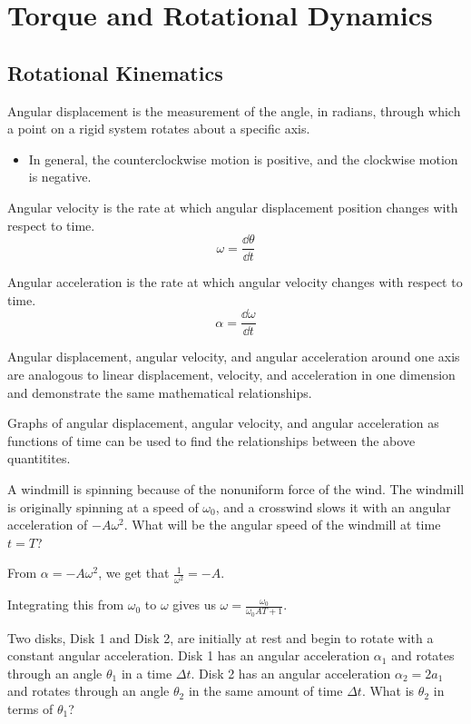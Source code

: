 \documentclass[../mech.tex]{subfiles}
\begin{document}
\chapter{Torque and Rotational Dynamics}
\section{Rotational Kinematics}
Angular displacement is the measurement of the angle, in radians, through which a point on a rigid system rotates about a specific axis.
\begin{itemize}
    \item In general, the counterclockwise motion is positive, and the clockwise motion is negative.
\end{itemize}

Angular velocity is the rate at which angular displacement position changes with respect to time.
\[ \omega = \frac{\dd \theta}{\dd t} \]

Angular acceleration is the rate at which angular velocity changes with respect to time.
\[ \alpha = \frac{\dd \omega}{\dd t} \]

Angular displacement, angular velocity, and angular acceleration around one axis are analogous to linear displacement, velocity, and acceleration in one dimension and demonstrate the same mathematical relationships.

Graphs of angular displacement, angular velocity, and angular acceleration as functions of time can be used to find the relationships between the above quantitites.

\begin{example}
    A windmill is spinning because of the nonuniform force of the wind. The windmill is originally spinning at a speed of $\omega_0$, and a crosswind slows it with an angular acceleration 
    of $-A\omega^2$. What will be the angular speed of the windmill at time $t=T$?

    From $\alpha = -A\omega^2$, we get that $\frac{1}{\omega^2}=-A$.

    Integrating this from $\omega_0$ to $\omega$ gives us $\omega = \frac{\omega_0}{\omega_0 AT + 1}$.
\end{example}

\ex Two disks, Disk 1 and Disk 2, are initially at rest and begin to rotate with a constant angular acceleration. Disk 1 has an angular acceleration $\alpha_1$ and rotates through an angle 
$\theta_1$ in a time $\Delta t$. Disk 2 has an angular acceleration $\alpha_2 = 2a_1$ and rotates through an angle $\theta_2$ in the same amount of time $\Delta t$. What is $\theta_2$ in terms of $\theta_1$?
\end{document}
